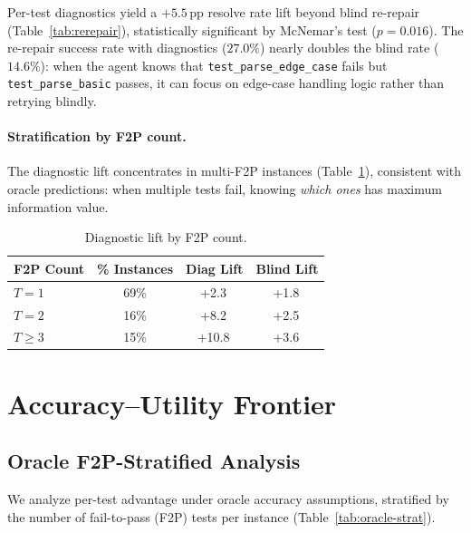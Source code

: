 \documentclass[11pt,a4paper]{article}
\newcommand{\pp}{\,\text{pp}}
\begin{document}
Per-test diagnostics yield a $+5.5\pp$ resolve rate lift beyond blind re-repair (Table~\ref{tab:rerepair}), statistically significant by McNemar's test ($p{=}0.016$).
The re-repair success rate with diagnostics ($27.0\%$) nearly doubles the blind rate ($14.6\%$): when the agent knows that \texttt{test\_parse\_edge\_case} fails but \texttt{test\_parse\_basic} passes, it can focus on edge-case handling logic rather than retrying blindly.

\paragraph{Stratification by F2P count.}
The diagnostic lift concentrates in multi-F2P instances (Table~\ref{tab:rerepair-strat}), consistent with oracle predictions: when multiple tests fail, knowing \emph{which ones} has maximum information value.

\begin{table}[t]
\centering
\small
\begin{tabular}{lccc}
\toprule
\textbf{F2P Count} & \textbf{\% Instances} & \textbf{Diag Lift} & \textbf{Blind Lift} \\
\midrule
$T{=}1$ & 69\% & +2.3\pp & +1.8\pp \\
$T{=}2$ & 16\% & +8.2\pp & +2.5\pp \\
$T{\geq}3$ & 15\% & +10.8\pp & +3.6\pp \\
\bottomrule
\end{tabular}
\caption{Diagnostic lift by F2P count.}
\label{tab:rerepair-strat}
\end{table}

\section{Accuracy--Utility Frontier}
\label{sec:frontier}

\subsection{Oracle F2P-Stratified Analysis}

We analyze per-test advantage under oracle accuracy assumptions, stratified by the number of fail-to-pass (F2P) tests per instance (Table~\ref{tab:oracle-strat}).
\end{document}
